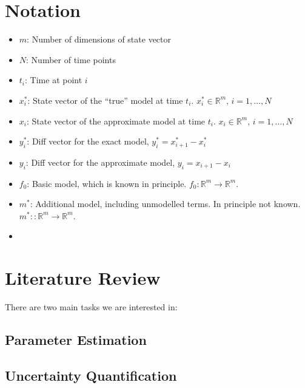 \documentclass[12pt]{article}
\begin{document}
\section{Notation}

\begin{itemize}

\item
  $m$: Number of dimensions of state vector

\item
  $N$: Number of time points

\item
  $t_i$: Time at point $i$

\item
  $x_i^*$: State vector of the ``true'' model at time $t_i$. $x_i^* \in \mathbb{R}^m,\, i=1,\ldots, N$

\item
  $x_i$: State vector of the approximate model at time $t_i$. $x_i \in \mathbb{R}^m,\, i=1,\ldots, N$

\item
  $y_i^*$: Diff vector for the exact model, $y_i^* = x_{i+1}^* - x_i^*$
  
\item
  $y_i$: Diff vector for the approximate model, $y_i = x_{i+1} - x_i$

\item
  $f_0$: Basic model, which is known in principle. $f_0: \mathbb{R}^m \to \mathbb{R}^m$.

\item
  $m^*$: Additional model, including unmodelled terms. In principle not known. $m^*: : \mathbb{R}^m \to \mathbb{R}^m$.

\item
  

\end{itemize}



\section{Literature Review}

There are two main tasks we are interested in: 

\subsection{Parameter Estimation}

\subsection{Uncertainty Quantification}
\end{document}
